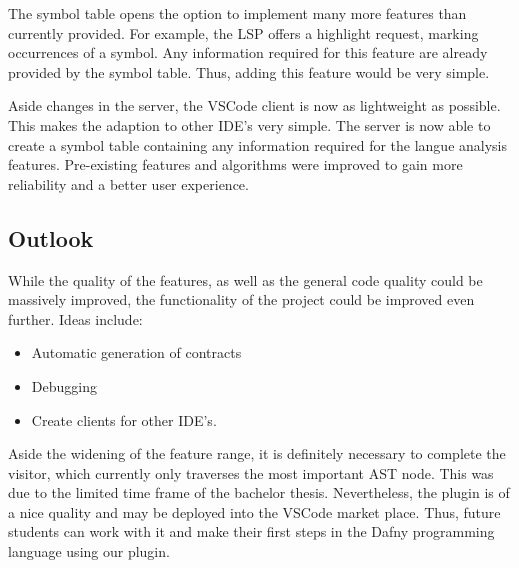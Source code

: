 The symbol table opens the option to implement many more features than currently provided.
For example, the LSP offers a highlight request, marking occurrences of a symbol.
Any information required for this feature are already provided by the symbol table.
Thus, adding this feature would be very simple.


Aside changes in the server, the VSCode client is now as lightweight as possible.
This makes the adaption to other IDE's very simple.
The server is now able to create a symbol table containing any information required for the langue analysis features.
Pre-existing features and algorithms were improved to gain more reliability and a better user experience.


\subsection{Outlook}
While the quality of the features, as well as the general code quality could be massively improved, the functionality of the project could be improved even further.
Ideas include:
\begin{itemize}
    \item Automatic generation of contracts
    \item Debugging
    \item Create clients for other IDE's.
\end{itemize}
Aside the widening of the feature range, it is definitely necessary to complete the visitor, which currently only traverses the most important AST node.
This was due to the limited time frame of the bachelor thesis.
Nevertheless, the plugin is of a nice quality and may be deployed into the VSCode market place.
Thus, future students can work with it and make their first steps in the Dafny programming language using our plugin.
